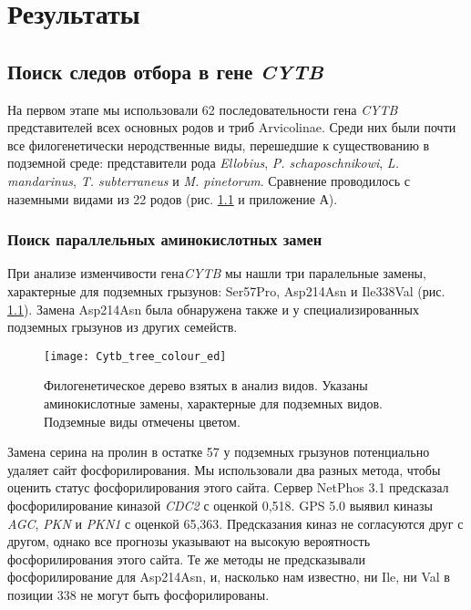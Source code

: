 \chapter{Результаты}\label{res}

\section{Поиск следов отбора в гене \textit{CYTB}}

На первом этапе мы использовали 62 последовательности гена \textit{CYTB} представителей всех основных родов и триб Arvicolinae. Среди них были почти все филогенетически неродственные виды, перешедшие к существованию в подземной среде: представители рода \textit{Ellobius}, \textit{P. schaposchnikowi}, \textit{L. mandarinus}, \textit{T. subterraneus} и \textit{M. pinetorum}. Сравнение проводилось с наземными видами из 22 родов (рис. \ref{PhyloTree} и приложение А). 

\subsection{Поиск параллельных аминокислотных замен}

При анализе изменчивости гена\textit{CYTB} мы нашли три паралельные замены, характерные для подземных грызунов: Ser57Pro, Asp214Asn и Ile338Val (рис. \ref{PhyloTree}). Замена Asp214Asn была обнаружена также и у специализированных подземных грызунов из других семейств.

\begin{figure}[h!]
	\begin{center}
		\texttt{[image: Cytb\_tree\_colour\_ed]}
	\end{center}
	\caption{Филогенетическое дерево взятых в анализ видов. Указаны аминокислотные замены, характерные для подземных видов. Подземные виды отмечены цветом.}
	\label{PhyloTree}
\end{figure}

\clearpage

Замена серина на пролин в остатке 57 у подземных грызунов потенциально удаляет сайт фосфорилирования. Мы использовали два разных метода, чтобы оценить статус фосфорилирования этого сайта. Сервер NetPhos 3.1 предсказал фосфорилирование киназой \textit{CDC2} с оценкой 0,518. GPS 5.0 выявил киназы \textit{AGC}, \textit{PKN} и \textit{PKN1} с оценкой 65,363. Предсказания киназ не согласуются друг с другом, однако все прогнозы указывают на высокую вероятность фосфорилирования этого сайта. Те же методы не предсказывали фосфорилирование для Asp214Asn, и, насколько нам известно, ни Ile, ни Val в позиции 338 не могут быть фосфорилированы.

